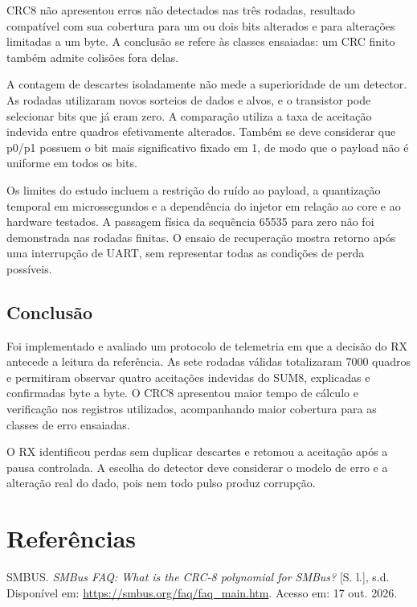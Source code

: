 \documentclass[12pt,a4paper]{article}
\begin{document}
CRC8 não apresentou erros não detectados nas três rodadas, resultado compatível com sua cobertura para um ou dois bits alterados e para alterações limitadas a um byte. A conclusão se refere às classes ensaiadas: um CRC finito também admite colisões fora delas.

A contagem de descartes isoladamente não mede a superioridade de um detector. As rodadas utilizaram novos sorteios de dados e alvos, e o transistor pode selecionar bits que já eram zero. A comparação utiliza a taxa de aceitação indevida entre quadros efetivamente alterados. Também se deve considerar que p0/p1 possuem o bit mais significativo fixado em 1, de modo que o payload não é uniforme em todos os bits.

Os limites do estudo incluem a restrição do ruído ao payload, a quantização temporal em microssegundos e a dependência do injetor em relação ao core e ao hardware testados. A passagem física da sequência 65535 para zero não foi demonstrada nas rodadas finitas. O ensaio de recuperação mostra retorno após uma interrupção de UART, sem representar todas as condições de perda possíveis.

\subsection{Conclusão}
Foi implementado e avaliado um protocolo de telemetria em que a decisão do RX antecede a leitura da referência. As sete rodadas válidas totalizaram 7000 quadros e permitiram observar quatro aceitações indevidas do SUM8, explicadas e confirmadas byte a byte. O CRC8 apresentou maior tempo de cálculo e verificação nos registros utilizados, acompanhando maior cobertura para as classes de erro ensaiadas.

O RX identificou perdas sem duplicar descartes e retomou a aceitação após a pausa controlada. A escolha do detector deve considerar o modelo de erro e a alteração real do dado, pois nem todo pulso produz corrupção.

\FloatBarrier\clearpage\section*{Referências}
\begingroup\setlength{\parindent}{0pt}\small SMBUS. \emph{SMBus FAQ: What is the CRC-8 polynomial for SMBus?} [S. l.], s.d. Disponível em: \url{https://smbus.org/faq/faq_main.htm}. Acesso em: 17 out. 2026.\par\endgroup
\end{document}
